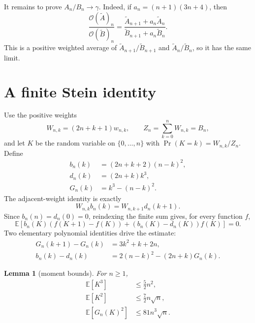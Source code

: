 \documentclass[11pt]{article}
\newtheorem{lemma}[theorem]{Lemma}
\newcommand{\E}{\mathbb E}
\begin{document}
It remains to prove $A_n/B_n\to\gamma$.  Indeed, if $a_n=(n+1)(3n+4)$, then
\[
 \frac{\mathcal O(\widetilde A)_n}{\mathcal O(\widetilde B)_n}
 =\frac{\widetilde A_{n+1}+a_n\widetilde A_n}
        {\widetilde B_{n+1}+a_n\widetilde B_n}.
\]
This is a positive weighted average of
$\widetilde A_{n+1}/\widetilde B_{n+1}$ and
$\widetilde A_n/\widetilde B_n$, so it has the same limit.

\section{A finite Stein identity}

Use the positive weights
\[
 W_{n,k}=(2n+k+1)w_{n,k},\qquad
 Z_n=\sum_{k=0}^nW_{n,k}=B_n,
\]
and let $K$ be the random variable on $\{0,\ldots,n\}$ with
$\Pr(K=k)=W_{n,k}/Z_n$.  Define
\begin{align*}
 b_n(k)&=(2n+k+2)(n-k)^2,\\
 d_n(k)&=(2n+k)k^3,\\
 G_n(k)&=k^3-(n-k)^2.
\end{align*}
The adjacent-weight identity is exactly
\begin{equation}\label{eq:detailedbalance}
 W_{n,k}b_n(k)=W_{n,k+1}d_n(k+1).
\end{equation}
Since $b_n(n)=d_n(0)=0$, reindexing the finite sum gives, for every function
$f$,
\begin{equation}\label{eq:stein}
 \E\!\left[b_n(K)(f(K+1)-f(K))
 +(b_n(K)-d_n(K))f(K)\right]=0.
\end{equation}
Two elementary polynomial identities drive the estimate:
\begin{align}
G_n(k+1)-G_n(k)&=3k^2+k+2n,                                      \label{eq:deltaG}\\
b_n(k)-d_n(k)&=2(n-k)^2-(2n+k)G_n(k).                            \label{eq:bminusd}
\end{align}

\begin{lemma}[moment bounds]\label{lem:moments}
For $n\ge1$,
\begin{align}
 \E[K^3]&\le \frac52n^2,                                        \label{eq:k3}\\
 \E[K^2]&\le \frac72n\sqrt n,                                  \label{eq:k2}\\
 \E[G_n(K)^2]&\le81n^3\sqrt n.                                 \label{eq:G2}
\end{align}
\end{lemma}
\end{document}
